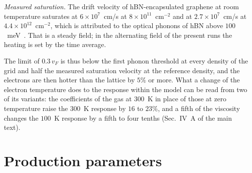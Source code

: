 \documentclass[aps,prapplied,onecolumn,superscriptaddress,floatfix]{revtex4-2}
\begin{document}
\emph{Measured saturation.} The drift velocity of hBN-encapsulated
graphene at room temperature saturates at $6\times10^{7}$~cm/s at
$8\times10^{11}$~cm$^{-2}$ and at $2.7\times10^{7}$~cm/s at
$4.4\times10^{12}$~cm$^{-2}$, which is attributed to the optical phonons
of hBN above $100$~meV~\cite{yamoah2017high}. That is a steady field; in
the alternating field of the present runs the heating is set by the time
average.

The limit of $0.3\,v_{F}$ is thus below the first phonon threshold at
every density of the grid and half the measured saturation velocity at
the reference density, and the electrons are then hotter than the lattice
by $5\%$ or more. What a change of the electron temperature does to the
response within the model can be read from two of its variants: the
coefficients of the gas at $300$~K in place of those at zero temperature
raise the $300$~K response by $16$ to $23\%$, and a fifth of the viscosity changes
the $100$~K response by a fifth to four tenths (Sec.~IV~A of the main text).

\section{Production parameters}
\end{document}
